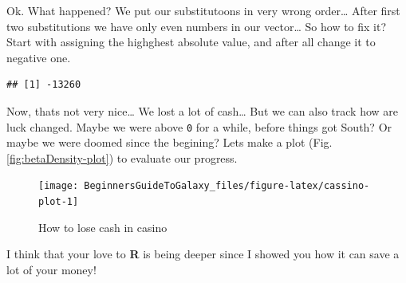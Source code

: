 \documentclass[]{book}
\newenvironment{Shaded}{\begin{snugshade}}{\end{snugshade}}
\newcommand{\KeywordTok}[1]{\textcolor[rgb]{0.12,0.11,0.11}{\textbf{#1}}}
\newcommand{\DecValTok}[1]{\textcolor[rgb]{0.69,0.50,0.00}{#1}}
\newcommand{\StringTok}[1]{\textcolor[rgb]{0.75,0.01,0.01}{#1}}
\newcommand{\OperatorTok}[1]{\textcolor[rgb]{0.12,0.11,0.11}{#1}}
\newcommand{\NormalTok}[1]{\textcolor[rgb]{0.12,0.11,0.11}{#1}}
\theoremstyle{definition}
\theoremstyle{definition}
\theoremstyle{definition}
\theoremstyle{remark}
\begin{document}
Ok. What happened? We put our substitutoons in very wrong order\ldots{}
After first two substitutions we have only even numbers in our
vector\ldots{} So how to fix it? Start with assigning the highghest
absolute value, and after all change it to negative one.

\begin{Shaded}
\end{Shaded}

\begin{verbatim}
## [1] -13260
\end{verbatim}

Now, thats not very nice\ldots{} We lost a lot of cash\ldots{} But we
can also track how are luck changed. Maybe we were above \texttt{0} for
a while, before things got South? Or maybe we were doomed since the
begining? Lets make a plot (Fig. \ref{fig:betaDensity-plot}) to evaluate
our progress.

\begin{figure}

{\centering \texttt{[image: BeginnersGuideToGalaxy\_files/figure-latex/cassino-plot-1]} 

}

\caption{How to lose cash in casino}\label{fig:cassino-plot}
\end{figure}

I think that your love to \textbf{R} is being deeper since I showed you
how it can save a lot of your money!
\end{document}
